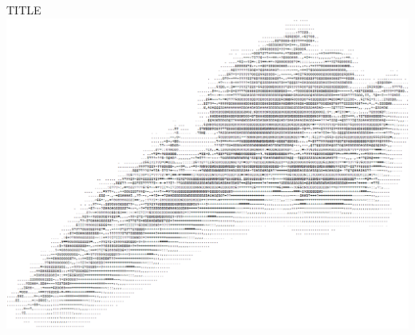 \thispagestyle{empty}
\begin{center}
  \Huge
	TITLE
	\vspace*{1.5in}~\\
	\hspace*{-1in}
    \includegraphics[scale=0.60]{Figures/FrontPage/FrontPage.png}
			
\end{center}



